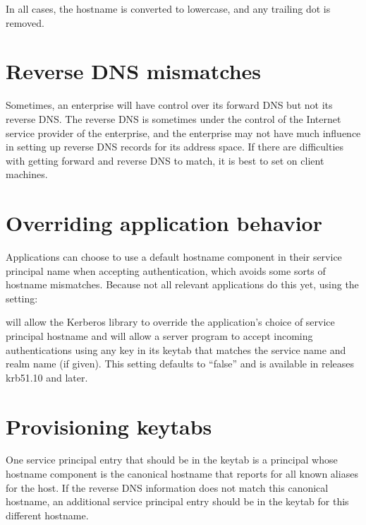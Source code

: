 \documentclass[letterpaper,10pt,english]{sphinxmanual}
\begin{document}
\sphinxAtStartPar
In all cases, the hostname is converted to lowercase, and any trailing
dot is removed.


\section{Reverse DNS mismatches}
\label{\detokenize{admin/princ_dns:reverse-dns-mismatches}}
\sphinxAtStartPar
Sometimes, an enterprise will have control over its forward DNS but
not its reverse DNS.  The reverse DNS is sometimes under the control
of the Internet service provider of the enterprise, and the enterprise
may not have much influence in setting up reverse DNS records for its
address space.  If there are difficulties with getting forward and
reverse DNS to match, it is best to set  on client
machines.


\section{Overriding application behavior}
\label{\detokenize{admin/princ_dns:overriding-application-behavior}}
\sphinxAtStartPar
Applications can choose to use a default hostname component in their
service principal name when accepting authentication, which avoids
some sorts of hostname mismatches.  Because not all relevant
applications do this yet, using the {\hyperref[\detokenize{admin/conf_files/krb5_conf:krb5-conf-5}]{}} setting:

\begin{sphinxVerbatim}[commandchars=\\\{\}]
\PYG{p}{[}\PYG{p}{]}
      
\end{sphinxVerbatim}

\sphinxAtStartPar
will allow the Kerberos library to override the application’s choice
of service principal hostname and will allow a server program to
accept incoming authentications using any key in its keytab that
matches the service name and realm name (if given).  This setting
defaults to “false” and is available in releases krb5\sphinxhyphen{}1.10 and later.


\section{Provisioning keytabs}
\label{\detokenize{admin/princ_dns:provisioning-keytabs}}
\sphinxAtStartPar
One service principal entry that should be in the keytab is a
principal whose hostname component is the canonical hostname that
 reports for all known aliases for the host.  If the
reverse DNS information does not match this canonical hostname, an
additional service principal entry should be in the keytab for this
different hostname.
\end{document}
